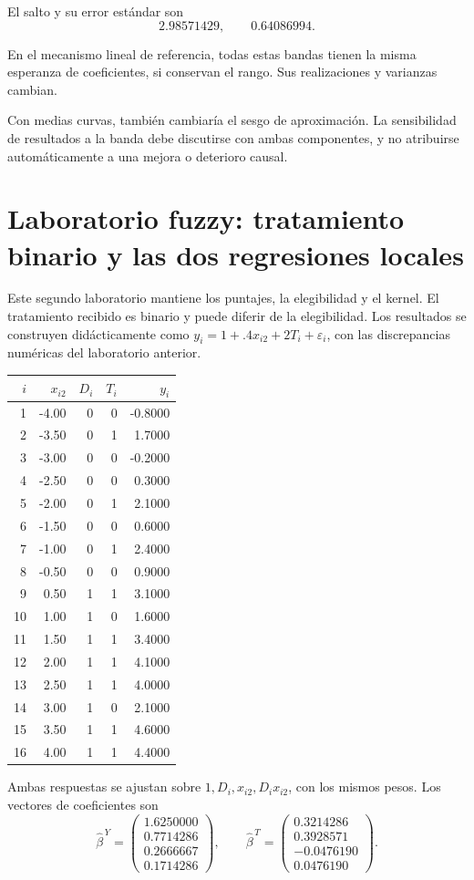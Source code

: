 \documentclass[11pt,a4paper]{article}
\begin{document}
El salto y su error estándar son
\[
2.98571429,\qquad 0.64086994.
\]

En el mecanismo lineal de referencia,
todas estas bandas tienen la misma
esperanza de coeficientes,
si conservan el rango.
Sus realizaciones y varianzas cambian.

Con medias curvas, también cambiaría
el sesgo de aproximación.
La sensibilidad de resultados a la banda
debe discutirse con ambas componentes,
y no atribuirse automáticamente
a una mejora o deterioro causal.

\clearpage
\section{Laboratorio fuzzy: tratamiento binario y las dos regresiones locales}\label{unidad60}
Este segundo laboratorio mantiene los puntajes,
la elegibilidad y el kernel.
El tratamiento recibido es binario y
puede diferir de la elegibilidad.
Los resultados se construyen didácticamente
como \(y_i=1+.4x_{i2}+2T_i+\varepsilon_i\),
con las discrepancias numéricas del laboratorio anterior.
\begin{center}\small\begin{tabular}{rrrrr}\toprule
\(i\)&\(x_{i2}\)&\(D_i\)&\(T_i\)&\(y_i\)\\\midrule
1&-4.00&0&0&-0.8000\\
2&-3.50&0&1&1.7000\\
3&-3.00&0&0&-0.2000\\
4&-2.50&0&0&0.3000\\
5&-2.00&0&1&2.1000\\
6&-1.50&0&0&0.6000\\
7&-1.00&0&1&2.4000\\
8&-0.50&0&0&0.9000\\
9&0.50&1&1&3.1000\\
10&1.00&1&0&1.6000\\
11&1.50&1&1&3.4000\\
12&2.00&1&1&4.1000\\
13&2.50&1&1&4.0000\\
14&3.00&1&0&2.1000\\
15&3.50&1&1&4.6000\\
16&4.00&1&1&4.4000\\\bottomrule\end{tabular}\end{center}
Ambas respuestas se ajustan sobre
\(1,D_i,x_{i2},D_ix_{i2}\),
con los mismos pesos.
Los vectores de coeficientes son
\[
\widehat\beta^{\,Y}=\begin{pmatrix}1.6250000\\0.7714286\\0.2666667\\0.1714286\end{pmatrix},\qquad\widehat\beta^{\,T}=\begin{pmatrix}0.3214286\\0.3928571\\-0.0476190\\0.0476190\end{pmatrix}.
\]
\end{document}
